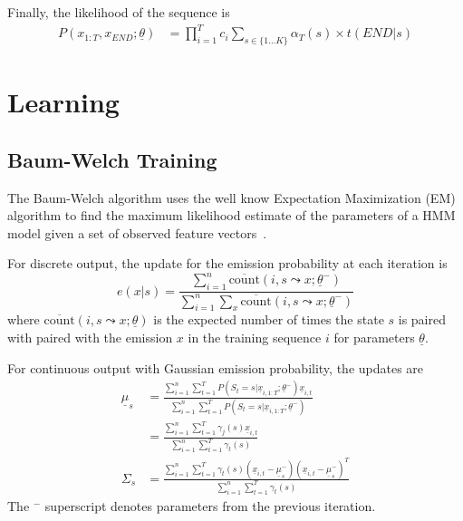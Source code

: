 Finally, the likelihood of the sequence is
\begin{align*}
P(x_{1:T}, x_{END}; \underline{\theta})
    &= \prod_{i = 1}^T c_i \sum_{s\in \{1\ldots K\}}\alpha_T(s)\times
    t(END|s)
\end{align*}

\section{Learning}
\subsection{Baum-Welch Training}
The Baum-Welch algorithm uses the well know Expectation Maximization (EM)
algorithm to find the maximum likelihood estimate of the parameters of a
HMM model given a set of observed feature vectors~\cite{baum-welch14}.

For discrete output, the update for the emission probability at each iteration
is
\begin{equation*}
e(x|s) = \frac{\sum_{i=1}^n \overline{\text{count}}(i, s\leadsto x;
\underline{\theta}^-)}{\sum_{i=1}^n \sum_x \overline{\text{count}}(i,
s\leadsto x;
\underline{\theta}^-)}
\end{equation*}
where $\overline{\text{count}}(i, s\leadsto x;
\underline{\theta})$ is the expected number of times the state $s$ is
paired with paired with the emission $x$ in the training sequence $i$ for
parameters $\underline{\theta}$.

For continuous output with Gaussian emission probability, the updates are 
\begin{align*}
\underline{\mu}_s &= \frac{\sum_{i=1}^n\sum_{t=1}^T P(S_t = s |
\underline{x}_{i, 1:T};\underline{\theta}^-)\underline{x}_{i,
t}}{\sum_{i=1}^n\sum_{t=1}^T P(S_t = s | \underline{x}_{i,
1:T};\underline{\theta}^-)} \\
&= \frac{\sum_{i=1}^n\sum_{t=1}^T \gamma_j(s)\underline{x}_{i,
t}}{\sum_{i=1}^n\sum_{t=1}^T \gamma_t(s)} \\
\Sigma_s &= \frac{\sum_{i=1}^n\sum_{t=1}^T \gamma_t(s)(\underline{x}_{i,
t} - \underline{\mu}_s^-)(\underline{x}_{i, t} -
\underline{\mu}_s^-)^T}{\sum_{i=1}^n\sum_{t=1}^T \gamma_t(s)}
\end{align*}
The $^-$ superscript denotes parameters from the previous iteration.

